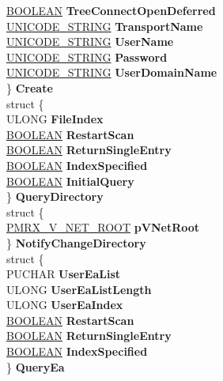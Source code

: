 \begin{DoxyCompactItemize}
\begin{tabbing}
\>\>\hyperlink{_processor_bind_8h_a112e3146cb38b6ee95e64d85842e380a}{BOOLEAN} {\bfseries TreeConnectOpenDeferred}\\
\>\>\hyperlink{struct___u_n_i_c_o_d_e___s_t_r_i_n_g}{UNICODE\_STRING} {\bfseries TransportName}\\
\>\>\hyperlink{struct___u_n_i_c_o_d_e___s_t_r_i_n_g}{UNICODE\_STRING} {\bfseries UserName}\\
\>\>\hyperlink{struct___u_n_i_c_o_d_e___s_t_r_i_n_g}{UNICODE\_STRING} {\bfseries Password}\\
\>\>\hyperlink{struct___u_n_i_c_o_d_e___s_t_r_i_n_g}{UNICODE\_STRING} {\bfseries UserDomainName}\\
\>\} {\bfseries Create}\\
\>struct \{\\
\>\>ULONG {\bfseries FileIndex}\\
\>\>\hyperlink{_processor_bind_8h_a112e3146cb38b6ee95e64d85842e380a}{BOOLEAN} {\bfseries RestartScan}\\
\>\>\hyperlink{_processor_bind_8h_a112e3146cb38b6ee95e64d85842e380a}{BOOLEAN} {\bfseries ReturnSingleEntry}\\
\>\>\hyperlink{_processor_bind_8h_a112e3146cb38b6ee95e64d85842e380a}{BOOLEAN} {\bfseries IndexSpecified}\\
\>\>\hyperlink{_processor_bind_8h_a112e3146cb38b6ee95e64d85842e380a}{BOOLEAN} {\bfseries InitialQuery}\\
\>\} {\bfseries QueryDirectory}\\
\>struct \{\\
\>\>\hyperlink{struct___m_r_x___v___n_e_t___r_o_o_t__}{PMRX\_V\_NET\_ROOT} {\bfseries pVNetRoot}\\
\>\} {\bfseries NotifyChangeDirectory}\\
\>struct \{\\
\>\>PUCHAR {\bfseries UserEaList}\\
\>\>ULONG {\bfseries UserEaListLength}\\
\>\>ULONG {\bfseries UserEaIndex}\\
\>\>\hyperlink{_processor_bind_8h_a112e3146cb38b6ee95e64d85842e380a}{BOOLEAN} {\bfseries RestartScan}\\
\>\>\hyperlink{_processor_bind_8h_a112e3146cb38b6ee95e64d85842e380a}{BOOLEAN} {\bfseries ReturnSingleEntry}\\
\>\>\hyperlink{_processor_bind_8h_a112e3146cb38b6ee95e64d85842e380a}{BOOLEAN} {\bfseries IndexSpecified}\\
\>\} {\bfseries QueryEa}\\

\end{tabbing}
\end{DoxyCompactItemize}

